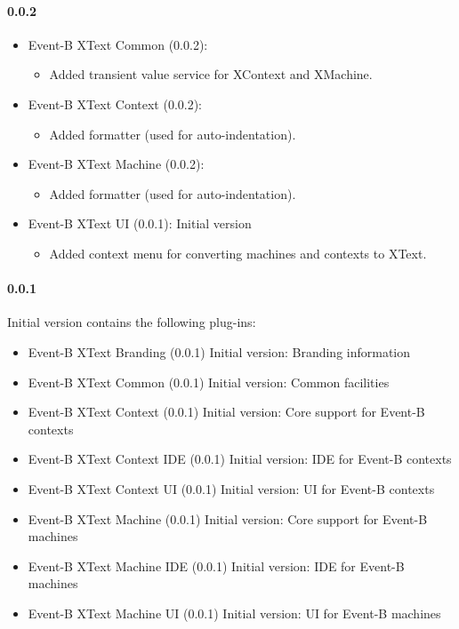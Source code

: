 \paragraph{0.0.2}
\begin{itemize}
\item Event-B XText Common (0.0.2):
  \begin{itemize}
  \item Added transient value service for XContext and XMachine.
  \end{itemize}

\item Event-B XText Context (0.0.2):
  \begin{itemize}
  \item Added formatter (used for auto-indentation).
  \end{itemize}

\item Event-B XText Machine (0.0.2):
  \begin{itemize}
  \item Added formatter (used for auto-indentation).
  \end{itemize}

\item Event-B XText UI (0.0.1): Initial version
  \begin{itemize}
  \item Added context menu for converting machines and contexts to XText.
  \end{itemize}
\end{itemize}

\paragraph{0.0.1} Initial version contains the following plug-ins:
\begin{itemize}
\item Event-B XText Branding (0.0.1) Initial version: Branding information

\item Event-B XText Common (0.0.1) Initial version: Common facilities

\item Event-B XText Context (0.0.1) Initial version: Core support for Event-B contexts

\item Event-B XText Context IDE (0.0.1) Initial version: IDE for Event-B contexts

\item Event-B XText Context UI (0.0.1) Initial version: UI for Event-B contexts

\item Event-B XText Machine (0.0.1) Initial version: Core support for Event-B machines

\item Event-B XText Machine IDE (0.0.1) Initial version: IDE for Event-B machines

\item Event-B XText Machine UI (0.0.1) Initial version: UI for Event-B machines
\end{itemize}


